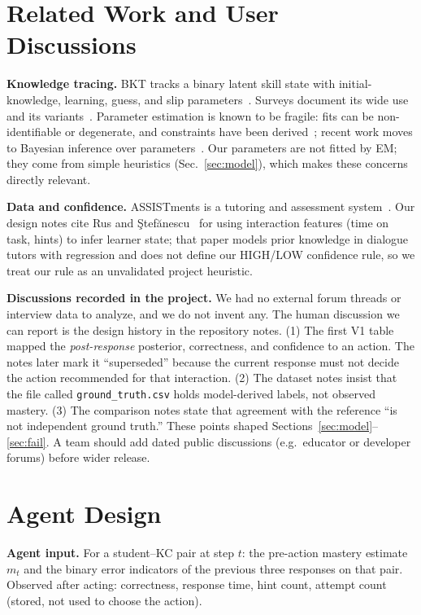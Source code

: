 \documentclass[10pt,twocolumn,letterpaper]{article}
\begin{document}
\section{Related Work and User Discussions}
\textbf{Knowledge tracing.} BKT tracks a binary latent skill state with initial-knowledge, learning, guess, and slip parameters~\cite{corbett1995}. Surveys document its wide use and its variants~\cite{pelanek2017,saricgrgic2024}. Parameter estimation is known to be fragile: fits can be non-identifiable or degenerate, and constraints have been derived~\cite{shchepakin2024}; recent work moves to Bayesian inference over parameters~\cite{pradhan2026}. Our parameters are not fitted by EM; they come from simple heuristics (Sec.~\ref{sec:model}), which makes these concerns directly relevant.

\textbf{Data and confidence.} ASSISTments is a tutoring and assessment system~\cite{feng2009}. Our design notes cite Rus and \c{S}tef\u{a}nescu~\cite{rus2016} for using interaction features (time on task, hints) to infer learner state; that paper models prior knowledge in dialogue tutors with regression and does not define our HIGH/LOW confidence rule, so we treat our rule as an unvalidated project heuristic.

\textbf{Discussions recorded in the project.} We had no external forum threads or interview data to analyze, and we do not invent any. The human discussion we can report is the design history in the repository notes. (1) The first V1 table mapped the \emph{post-response} posterior, correctness, and confidence to an action. The notes later mark it ``superseded'' because the current response must not decide the action recommended for that interaction. (2) The dataset notes insist that the file called \texttt{ground\_truth.csv} holds model-derived labels, not observed mastery. (3) The comparison notes state that agreement with the reference ``is not independent ground truth.'' These points shaped Sections~\ref{sec:model}--\ref{sec:fail}. A team should add dated public discussions (e.g.\ educator or developer forums) before wider release.

\section{Agent Design}
\textbf{Agent input.} For a student--KC pair at step $t$: the pre-action mastery estimate $m_t$ and the binary error indicators of the previous three responses on that pair. Observed after acting: correctness, response time, hint count, attempt count (stored, not used to choose the action).
\end{document}
